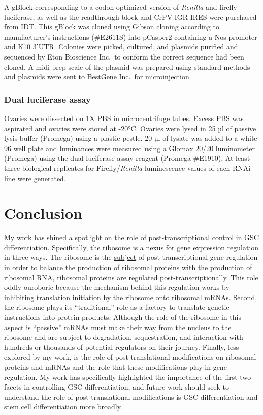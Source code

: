 \documentclass[12pt,oneside]{reedthesis}
\begin{document}
A gBlock corresponding to a codon optimized version of \emph{Renilla} and
firefly luciferase, as well as the readthrough block and CrPV IGR IRES
were purchased from IDT. This gBlock was cloned using Gibson cloning
according to manufacturer's instructions (\#E2611S) into pCasper2
containing a Nos promoter and K10 3'UTR. Colonies were picked, cultured,
and plasmids purified and sequenced by Eton Bioscience Inc.~to conform
the correct sequence had been cloned. A midi-prep scale of the plasmid
was prepared using standard methods and plasmids were sent to BestGene
Inc.~for microinjection.

\hypertarget{dual-luciferase-assay}{%
\subsection{Dual luciferase assay}\label{dual-luciferase-assay}}

Ovaries were dissected on 1X PBS in microcentrifuge tubes. Excess PBS
was aspirated and ovaries were stored at -20°C. Ovaries were lysed in 25
µl of passive lysis buffer (Promega) using a plastic pestle. 20 µl of
lysate was added to a white 96 well plate and luminances were measured
using a Glomax 20/20 luminometer (Promega) using the dual luciferase
assay reagent (Promega \#E1910). At least three biological replicates
for Firefly/\emph{Renilla} luminescence values of each RNAi line were
generated.

\setlength\parindent{24pt}

\hypertarget{conclusion}{%
\chapter{Conclusion}\label{conclusion}}

My work has shined a spotlight on the role of post-transcriptional control in GSC differentiation. Specifically, the ribosome is a nexus for gene expression regulation in three ways. The ribosome is the \underline{subject} of post-transcriptional gene regulation in order to balance the production of ribosomal proteins with the production of ribosomal RNA, ribosomal proteins are regulated post-transcriptionally. This role oddly ouroboric because the mechanism behind this regulation works by inhibiting translation initiation by the ribosome onto ribosomal mRNAs. Second, the ribosome plays its ``traditional'' role as a factory to translate genetic instructions into protein products. Although the role of the ribosome in this aspect is ``passive'' mRNAs must make their way from the nucleus to the ribosome and are subject to degradation, sequestration, and interaction with hundreds or thousands of potential regulators on their journey. Finally, less explored by my work, is the role of post-translational modifications on ribosomal proteins and mRNAs and the role that these modifications play in gene regulation. My work has specifically highlighted the importance of the first two facets in controlling GSC differentiation, and future work should seek to understand the role of post-translational modifications is GSC differentiation and stem cell differentiation more broadly.
\end{document}
